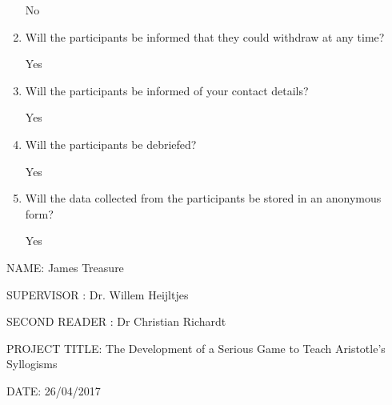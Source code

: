 \documentclass[12pt,a4paper]{report}
\begin{document}
\begin{appendices}
\begin{enumerate}
No

\item Will the participants be informed that they could withdraw at any time?  

Yes




\item Will the participants be informed of your contact details?    

Yes


\item Will the participants be debriefed?    

Yes

\item Will the data collected from the participants be stored in an anonymous form?                                                                       

Yes



\end{enumerate}

NAME: James Treasure


SUPERVISOR : Dr. Willem Heijltjes


SECOND READER : Dr Christian Richardt


PROJECT TITLE: The Development of a Serious Game to Teach Aristotle's Syllogisms


DATE: 26/04/2017


\end{appendices}
\end{document}
